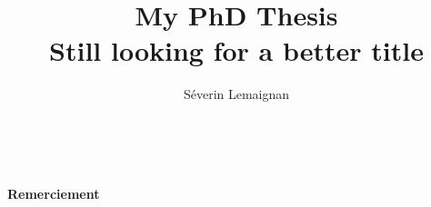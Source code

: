 \documentclass[a4paper,12pt]{book}
\title{
	\vspace{3em}
	\LARGE{\textbf{My PhD Thesis}}\\[1cm]
	\large{Still looking for a better title}\\[1cm]
	\vfill
}
\author{
Séverin Lemaignan
}
\begin{document}

\maketitle

\tableofcontents

\clearpage
\listoffixmes

\clearpage
\thispagestyle{empty}
~
\vfill
\begin{center}
    \LARGE{\textbf{Remerciement}}
\end{center}

\vspace{3em}

\vfill











\printglossaries





\end{document}
